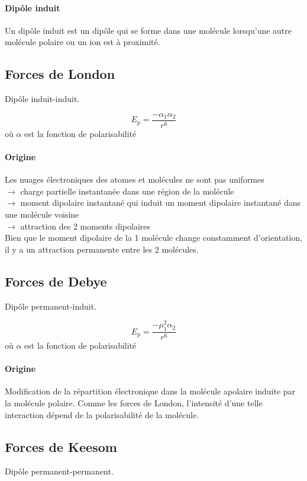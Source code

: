 \paragraph{Dipôle induit}
Un dipôle induit est un dipôle qui se forme dans une molécule lorsqu'une autre molécule
polaire ou un ion est à proximité.

\subsection{Forces de London}
Dipôle induit-induit.

\[ E_p = \frac{-\alpha_1 \alpha_2}{r^6} \]
où $\alpha$ est la fonction de polarisabilité

\paragraph{Origine}
Les nuages électroniques des atomes et molécules ne sont pas uniformes\\ $\rightarrow$ charge partielle instantanée dans une région de la molécule\\ $\rightarrow$ moment dipolaire instantané qui induit un moment dipolaire instantané dans une molécule voisine\\ $\rightarrow$ attraction des 2 moments dipolaires\\
Bien que le moment dipolaire de la 1 molécule change constamment d'orientation,
il y a un attraction permanente entre les 2 molécules.

\subsection{Forces de Debye}
Dipôle permanent-induit.

\[ E_p = \frac{-\mu_1^2 \alpha_2}{r^6} \]
où $\alpha$ est la fonction de polarisabilité

\paragraph{Origine}
Modification de la répartition électronique dans la molécule apolaire induite par la molécule polaire.
Comme les forces de London,
l'intensité d'une telle interaction dépend de la polarisabilité de la molécule.

\subsection{Forces de Keesom}
Dipôle permanent-permanent.

